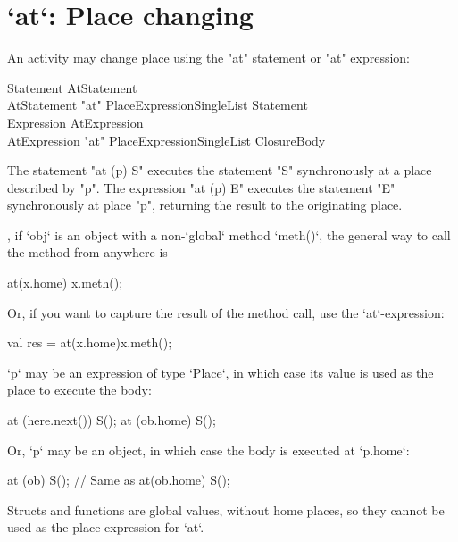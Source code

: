 \section{\xcd`at`: Place changing}\label{AtStatement}

An activity may change place using the \xcd"at" statement or
\xcd"at" expression:

\begin{grammar}
Statement \: AtStatement \\
AtStatement \: \xcd"at" PlaceExpressionSingleList Statement \\
Expression \: AtExpression \\
AtExpression \: \xcd"at" PlaceExpressionSingleList ClosureBody 
\end{grammar}

The statement \xcd"at (p) S" executes the statement \xcd"S"
synchronously at a place described by \xcd"p".
The expression \xcd"at (p) E" executes the statement \xcd"E"
synchronously at place \xcd"p", returning the result to the
originating place.  



\Eg, if \xcd`obj` is an object with a non-\xcd`global`
method \xcd`meth()`, the general way to call the method from anywhere is 
\begin{xten}
at(x.home) x.meth();
\end{xten}
\noindent 
Or, if you want to capture the result of the method call, use the
\xcd`at`-expression:  
\begin{xten}
val res = at(x.home)x.meth();
\end{xten}

\xcd`p` may be an expression of type \xcd`Place`, in which case its value is
used as the place to execute the body: 
\begin{xten}
   at (here.next()) S();
   at (ob.home) S();
\end{xten}
\noindent
Or, \xcd`p` may be an object, in which case the body is executed at
\xcd`p.home`: 
\begin{xten}
   at (ob) S();
   // Same as at(ob.home) S();
\end{xten}
Structs and functions are global values, without home places, so they cannot
be used as the place expression for \xcd`at`.  



